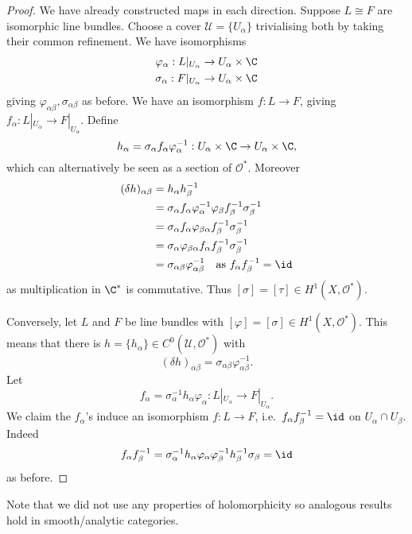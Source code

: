 \documentclass[a4paper]{article}
\begin{document}
\begin{proof}
  We have already constructed maps in each direction. Suppose \(L \cong F\) are isomorphic line bundles. Choose a cover \(\mathcal U = \{U_\alpha\}\) trivialising both by taking their common refinement. We have isomorphisms
  \begin{align*}
    \varphi_\alpha: L|_{U_\alpha} &\to U_\alpha \times \C \\
    \sigma_\alpha: F|_{U_\alpha} &\to U_\alpha \times \C \\
  \end{align*}
  giving \(\varphi_{\alpha\beta}, \sigma_{\alpha\beta}\) as before. We have an isomorphism \(f: L \to F\), giving \(f_\alpha: L|_{U_\alpha} \to F|_{U_\alpha}\). Define
  \[
    h_\alpha = \sigma_\alpha f_\alpha \varphi_\alpha^{-1}: U_\alpha \times \C \to U_\alpha \times \C,
  \]
  which can alternatively be seen as a section of \(\mathcal O^*\). Moreover
  \begin{align*}
    (\delta h)_{\alpha\beta}
    &= h_\alpha h_\beta^{-1} \\
    &= \sigma_\alpha f_\alpha \varphi_\alpha^{-1} \varphi_\beta f_\beta^{-1} \sigma_\beta^{-1} \\
    &= \sigma_\alpha f_\alpha \varphi_{\beta\alpha} f_\beta^{-1} \sigma_\beta^{-1} \\
    &= \sigma_\alpha \varphi_{\beta\alpha} f_\alpha f_\beta^{-1} \sigma_\beta^{-1} \\
    &= \sigma_{\alpha\beta} \varphi_{\alpha\beta}^{-1} \quad \text{as } f_\alpha f_\beta^{-1} = \id
  \end{align*}
  as multiplication in \(\C^*\) is commutative. Thus \([\sigma] = [\tau] \in H^1(X, \mathcal O^*)\).

  Conversely, let \(L\) and \(F\) be line bundles with \([\varphi] = [\sigma] \in H^1(X, \mathcal O^*)\). This means that there is \(h = \{h_\alpha\} \in C^0(\mathcal U, \mathcal O^*)\) with
  \[
    (\delta h)_{\alpha\beta} =\sigma_{\alpha\beta} \varphi_{\alpha\beta}^{-1}.
  \]
  Let
  \[
    f_\alpha = \sigma_\alpha^{-1} h_\alpha \varphi_\alpha: L|_{U_\alpha} \to F|_{U_\alpha}.
  \]
  We claim the \(f_\alpha\)'s induce an isomorphism \(f: L \to F\), i.e.\ \(f_\alpha f_\beta^{-1} = \id\) on \(U_\alpha \cap U_\beta\). Indeed
  \[
    f_\alpha f_\beta^{-1} = \sigma_\alpha^{-1} h_\alpha \varphi_\alpha \varphi_\beta^{-1} h_\beta^{-1} \sigma_\beta = \id
  \]
  as before.
\end{proof}

Note that we did not use any properties of holomorphicity so analogous results hold in smooth/analytic categories.
\end{document}
